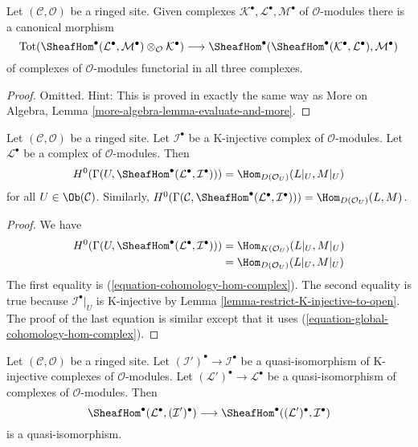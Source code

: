 \begin{lemma}
\label{lemma-evaluate-and-more}
Let $(\mathcal{C}, \mathcal{O})$ be a ringed site. Given complexes
$\mathcal{K}^\bullet, \mathcal{L}^\bullet, \mathcal{M}^\bullet$
of $\mathcal{O}$-modules there is a canonical morphism
$$
\text{Tot}(\SheafHom^\bullet(\mathcal{L}^\bullet,
\mathcal{M}^\bullet) \otimes_\mathcal{O} \mathcal{K}^\bullet)
\longrightarrow
\SheafHom^\bullet(\SheafHom^\bullet(\mathcal{K}^\bullet,
\mathcal{L}^\bullet), \mathcal{M}^\bullet)
$$
of complexes of $\mathcal{O}$-modules functorial in all three complexes.
\end{lemma}

\begin{proof}
Omitted. Hint: This is proved in exactly the same way as
More on Algebra, Lemma \ref{more-algebra-lemma-evaluate-and-more}.
\end{proof}

\begin{lemma}
\label{lemma-RHom-into-K-injective}
Let $(\mathcal{C}, \mathcal{O})$ be a ringed site. Let $\mathcal{I}^\bullet$
be a K-injective complex of $\mathcal{O}$-modules. Let
$\mathcal{L}^\bullet$ be a complex of $\mathcal{O}$-modules.
Then
$$
H^0(\Gamma(U, \SheafHom^\bullet(\mathcal{L}^\bullet, \mathcal{I}^\bullet))) =
\Hom_{D(\mathcal{O}_U)}(L|_U, M|_U)
$$
for all $U \in \Ob(\mathcal{C})$. Similarly,
$H^0(\Gamma(\mathcal{C},
\SheafHom^\bullet(\mathcal{L}^\bullet, \mathcal{I}^\bullet))) =
\Hom_{D(\mathcal{O}_U)}(L, M)$.
\end{lemma}

\begin{proof}
We have
\begin{align*}
H^0(\Gamma(U, \SheafHom^\bullet(\mathcal{L}^\bullet, \mathcal{I}^\bullet)))
& =
\Hom_{K(\mathcal{O}_U)}(L|_U, M|_U) \\
& =
\Hom_{D(\mathcal{O}_U)}(L|_U, M|_U)
\end{align*}
The first equality is (\ref{equation-cohomology-hom-complex}).
The second equality is true because $\mathcal{I}^\bullet|_U$
is K-injective by Lemma \ref{lemma-restrict-K-injective-to-open}.
The proof of the last equation is similar except that it uses
(\ref{equation-global-cohomology-hom-complex}).
\end{proof}

\begin{lemma}
\label{lemma-RHom-well-defined}
Let $(\mathcal{C}, \mathcal{O})$ be a ringed site. Let
$(\mathcal{I}')^\bullet \to \mathcal{I}^\bullet$
be a quasi-isomorphism of K-injective complexes of $\mathcal{O}$-modules.
Let $(\mathcal{L}')^\bullet \to \mathcal{L}^\bullet$
be a quasi-isomorphism of complexes of $\mathcal{O}$-modules.
Then
$$
\SheafHom^\bullet(\mathcal{L}^\bullet, (\mathcal{I}')^\bullet)
\longrightarrow
\SheafHom^\bullet((\mathcal{L}')^\bullet, \mathcal{I}^\bullet)
$$
is a quasi-isomorphism.
\end{lemma}

